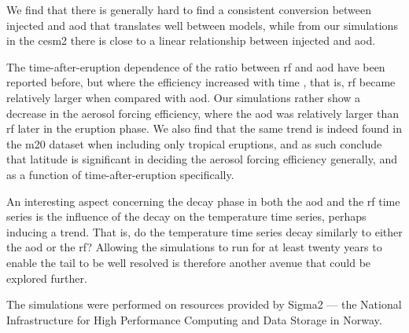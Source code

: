 \documentclass{ametsocV6.1}
\newcommand{\iso}[1][i]{{#1}njected \ce{SO2}}
\begin{document}
We find that there is generally hard to find a consistent conversion between \iso{} and
\gls{aod} that translates well between models, while from our simulations in the
\gls{cesm2} there is close to a linear relationship between \iso{} and \gls{aod}.

The time-after-eruption dependence of the ratio between \gls{rf} and \gls{aod} have been
reported before, but where the efficiency increased with time \citep{marshall2020}, that
is, \gls{rf} became relatively larger when compared with \gls{aod}. Our simulations
rather show a decrease in the aerosol forcing efficiency, where the \gls{aod} was
relatively larger than \gls{rf} later in the eruption phase. We also find that the same
trend is indeed found in the \gls{m20} dataset when including only tropical eruptions,
and as such conclude that latitude is significant in deciding the aerosol forcing
efficiency generally, and as a function of time-after-eruption specifically.

An interesting aspect concerning the decay phase in both the \gls{aod} and the \gls{rf}
time series is the influence of the decay on the temperature time series, perhaps
inducing a trend. That is, do the temperature time series decay similarly to either the
\gls{aod} or the \gls{rf}? Allowing the simulations to run for at least twenty years to
enable the tail to be well resolved is therefore another avenue that could be explored
further.

\clearpage
\acknowledgments{}

The simulations were performed on resources provided by Sigma2 --- the National
Infrastructure for High Performance Computing and Data Storage in Norway.

%
%
\datastatement{}
\end{document}
